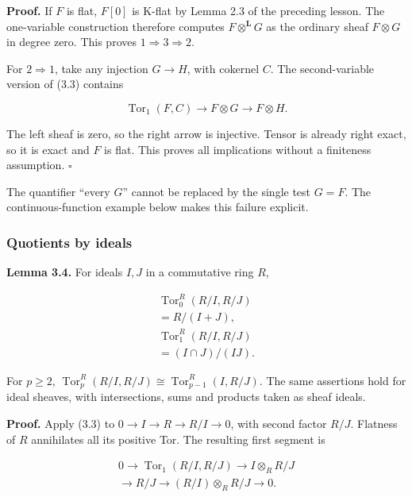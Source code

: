 \documentclass[
  english,
  11pt,
  a4paper,
]{article}
\begin{document}
\textbf{Proof.} If \(F\) is flat, \(F[0]\) is K-flat by Lemma 2.3 of the
preceding lesson. The one-variable construction therefore computes
\(F\otimes^{\mathbf L}G\) as the ordinary sheaf \(F\otimes G\) in degree
zero. This proves \(1\Rightarrow3\Rightarrow2\).

For \(2\Rightarrow1\), take any injection \(G\to H\), with cokernel
\(C\). The second-variable version of (3.3) contains

\[\operatorname{Tor}_1(F,C)\longrightarrow F\otimes G
\longrightarrow F\otimes H.\]

The left sheaf is zero, so the right arrow is injective. Tensor is
already right exact, so it is exact and \(F\) is flat. This proves all
implications without a finiteness assumption. \(\square\)

The quantifier ``every \(G\)'' cannot be replaced by the single test
\(G=F\). The continuous-function example below makes this failure
explicit.

\subsubsection{Quotients by
ideals}\label{derived-tensor-products-and-tor-sheaves--quotients-by-ideals}

\textbf{Lemma 3.4.} For ideals \(I,J\) in a commutative ring \(R\),

\[\begin{gathered}
\operatorname{Tor}_0^R(R/I,R/J)\\
{}=R/(I+J),\\
\operatorname{Tor}_1^R(R/I,R/J)\\
{}=(I\cap J)/(IJ).
\end{gathered}
\tag{3.4}\]

For \(p\ge2\), \(\operatorname{Tor}_p^R(R/I,R/J)\cong
\operatorname{Tor}_{p-1}^R(I,R/J)\). The same assertions hold for ideal
sheaves, with intersections, sums and products taken as sheaf ideals.

\textbf{Proof.} Apply (3.3) to \(0\to I\to R\to R/I\to0\), with second
factor \(R/J\). Flatness of \(R\) annihilates all its positive Tor. The
resulting first segment is

\[\begin{gathered}
0\longrightarrow\operatorname{Tor}_1(R/I,R/J)
\longrightarrow I\otimes_R R/J
\\
\longrightarrow R/J
\longrightarrow (R/I)\otimes_R R/J\longrightarrow0.
\end{gathered}\]
\end{document}
